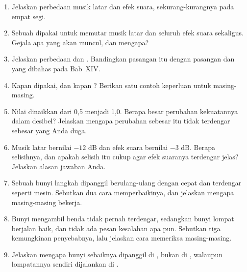 
\begin{enumerate}
  \item Jelaskan perbedaan musik latar dan efek suara, sekurang-kurangnya pada
        empat segi.

  \item Sebuah  dipakai untuk memutar musik latar dan seluruh
        efek suara sekaligus. Gejala apa yang akan muncul, dan mengapa?

  \item Jelaskan perbedaan  dan . Bandingkan
        pasangan itu dengan pasangan  dan
         yang dibahas pada Bab~XIV.

  \item Kapan  dipakai, dan kapan ? Berikan satu
        contoh keperluan untuk masing-masing.

  \item Nilai  dinaikkan dari 0,5 menjadi 1,0. Berapa besar
        perubahan kekuatannya dalam desibel? Jelaskan mengapa perubahan sebesar
        itu tidak terdengar sebesar yang Anda duga.

  \item Musik latar bernilai $-12$ dB dan efek suara bernilai $-3$ dB. Berapa
        selisihnya, dan apakah selisih itu cukup agar efek suaranya terdengar
        jelas? Jelaskan alasan jawaban Anda.

  \item Sebuah bunyi langkah dipanggil berulang-ulang dengan cepat dan terdengar
        seperti mesin. Sebutkan dua cara memperbaikinya, dan jelaskan mengapa
        masing-masing bekerja.

  \item Bunyi mengambil benda tidak pernah terdengar, sedangkan bunyi lompat
        berjalan baik, dan tidak ada pesan kesalahan apa pun. Sebutkan tiga
        kemungkinan penyebabnya, lalu jelaskan cara memeriksa masing-masing.

  \item Jelaskan mengapa bunyi sebaiknya dipanggil di , bukan di
        , walaupun lompatannya sendiri dijalankan di
        .
\end{enumerate}

